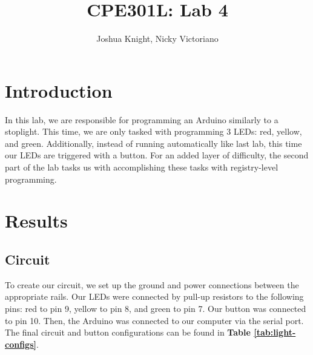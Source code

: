 \documentclass{article}
\title{CPE301L: Lab 4}
\author{Joshua Knight, Nicky Victoriano}
\begin{document}
\maketitle
 
\section{Introduction}

In this lab, we are responsible for programming an Arduino similarly to a stoplight. This time, we are only tasked with programming 3 LEDs: red, yellow, and green. Additionally, instead of running automatically like last lab, this time our LEDs are triggered with a button. For an added layer of difficulty, the second part of the lab tasks us with accomplishing these tasks with registry-level programming.

\section{Results}

\subsection{Circuit}

To create our circuit, we set up the ground and power connections between the appropriate rails. Our LEDs were connected by pull-up resistors to the following pins: red to pin 9, yellow to pin 8, and green to pin 7. Our button was connected to pin 10. Then, the Arduino was connected to our computer via the serial port. The final circuit and button configurations can be found in \textbf{Table \ref{tab:light-configs}}.
\end{document}
